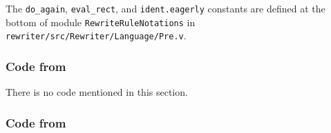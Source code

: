 \begin{subappendices}
\label{sec:code:eval-rect}%
\label{sec:code:ident.eagerly}%
The \verb|do_again|, \verb|eval_rect|, and \verb|ident.eagerly| constants are defined at the bottom of module \verb|RewriteRuleNotations| in \texttt{rewriter/src/Rewriter/Language/Pre.v}.

\subsubsection{Code from }

There is no code mentioned in this section.

\subsubsection{Code from }


\end{subappendices}
